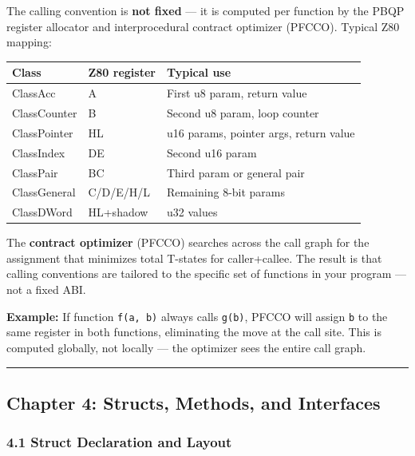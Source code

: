 \documentclass[
  11pt,
]{article}
\begin{document}
The calling convention is \textbf{not fixed} --- it is computed per
function by the PBQP register allocator and interprocedural contract
optimizer (PFCCO). Typical Z80 mapping:

\begin{longtable}[]{@{}lll@{}}
\toprule\noalign{}
Class & Z80 register & Typical use \\
\midrule\noalign{}
\endhead
\bottomrule\noalign{}
\endlastfoot
ClassAcc & A & First u8 param, return value \\
ClassCounter & B & Second u8 param, loop counter \\
ClassPointer & HL & u16 params, pointer args, return value \\
ClassIndex & DE & Second u16 param \\
ClassPair & BC & Third param or general pair \\
ClassGeneral & C/D/E/H/L & Remaining 8-bit params \\
ClassDWord & HL+shadow & u32 values \\
\end{longtable}

The \textbf{contract optimizer} (PFCCO) searches across the call graph
for the assignment that minimizes total T-states for caller+callee. The
result is that calling conventions are tailored to the specific set of
functions in your program --- not a fixed ABI.

\textbf{Example:} If function \texttt{f(a,\ b)} always calls
\texttt{g(b)}, PFCCO will assign \texttt{b} to the same register in both
functions, eliminating the move at the call site. This is computed
globally, not locally --- the optimizer sees the entire call graph.

\begin{center}\rule{0.5\linewidth}{0.5pt}\end{center}

\hypertarget{chapter-4-structs-methods-and-interfaces}{%
\subsection{Chapter 4: Structs, Methods, and
Interfaces}\label{chapter-4-structs-methods-and-interfaces}}

\hypertarget{struct-declaration-and-layout}{%
\subsubsection{4.1 Struct Declaration and
Layout}\label{struct-declaration-and-layout}}
\end{document}
